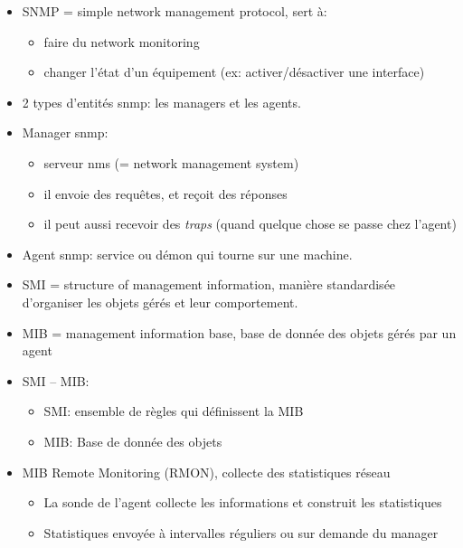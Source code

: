 \documentclass[a4paper]{article}
\begin{document}
\begin{itemize}


\item SNMP = simple network management protocol, sert à:
\begin{itemize}
    \item faire du network monitoring
    \item changer l'état d'un équipement (ex: activer/désactiver une interface)
\end{itemize}


\item 2 types d'entités snmp: les managers et les agents.


\item Manager snmp:
\begin{itemize}
    \item serveur nms (= network management system)
    \item il envoie des requêtes, et reçoit des réponses
    \item il peut aussi recevoir des \textit{traps} (quand quelque chose se passe chez l'agent)
\end{itemize}


\item Agent snmp: service ou démon qui tourne sur une machine.


\item SMI = structure of management information, manière standardisée d'organiser les objets gérés et leur comportement.


\item MIB = management information base, base de donnée des objets gérés par un agent


\item SMI -- MIB:
\begin{itemize}
    \item SMI: ensemble de règles qui définissent la MIB
    \item MIB: Base de donnée des objets
\end{itemize}


\item MIB Remote Monitoring (RMON), collecte des statistiques réseau
\begin{itemize}
    \item La sonde de l'agent collecte les informations et construit les statistiques
    \item Statistiques envoyée à intervalles réguliers ou sur demande du manager
\end{itemize}


\end{itemize}
\end{document}
